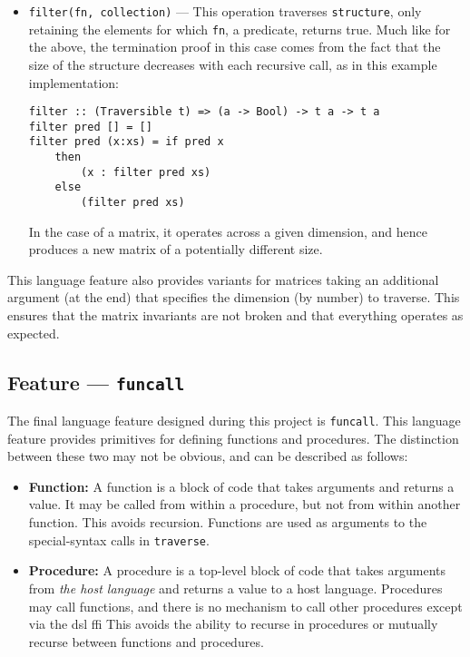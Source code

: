 \begin{itemize}
    \item \texttt{filter(fn, collection)} --- This operation traverses \texttt{structure}, only retaining the elements for which \texttt{fn}, a predicate, returns true.
    Much like for the above, the termination proof in this case comes from the fact that the size of the structure decreases with each recursive call, as in this example implementation:
\begin{verbatim}
filter :: (Traversible t) => (a -> Bool) -> t a -> t a
filter pred [] = []
filter pred (x:xs) = if pred x 
    then 
        (x : filter pred xs) 
    else 
        (filter pred xs)
\end{verbatim}
    In the case of a matrix, it operates across a given dimension, and hence produces a new matrix of a potentially different size. 
\end{itemize}

This language feature also provides variants for matrices taking an additional argument (at the end) that specifies the dimension (by number) to traverse. 
This ensures that the matrix invariants are not broken and that everything operates as expected. 


\subsection{Feature --- \texttt{funcall}} %
\label{sub:feature_funcall}
The final language feature designed during this project is \texttt{funcall}. 
This language feature provides primitives for defining functions and procedures.
The distinction between these two may not be obvious, and can be described as follows:
\begin{itemize}
    \item \textbf{Function:} A function is a block of code that takes arguments and returns a value. 
    It may be called from within a procedure, but not from within another function.
    This avoids recursion.
    Functions are used as arguments to the special-syntax calls in \texttt{traverse}.
    \item \textbf{Procedure:} A procedure is a top-level block of code that takes arguments from \textit{the host language} and returns a value to a host language.
    Procedures may call functions, and there is no mechanism to call other procedures except via the \gls{dsl} \gls{ffi}
    This avoids the ability to recurse in procedures or mutually recurse between functions and procedures. 
\end{itemize}

